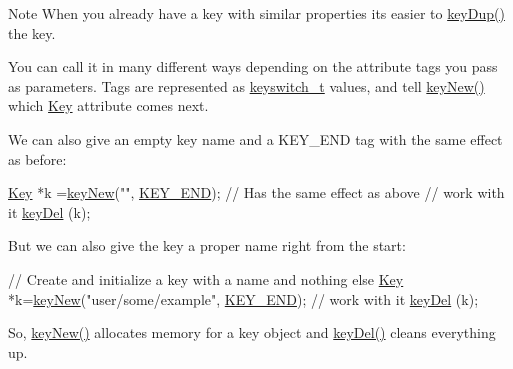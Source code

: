 \begin{DoxyNote}{Note}
When you already have a key with similar properties its easier to \hyperlink{group__key_gae6ec6a60cc4b8c1463fa08623d056ce3}{key\+Dup()} the key.
\end{DoxyNote}
You can call it in many different ways depending on the attribute tags you pass as parameters. Tags are represented as \hyperlink{group__key_ga91fb3178848bd682000958089abbaf40}{keyswitch\+\_\+t} values, and tell \hyperlink{group__key_gad23c65b44bf48d773759e1f9a4d43b89}{key\+New()} which \hyperlink{classkdb_1_1Key}{Key} attribute comes next.

We can also give an empty key name and a K\+E\+Y\+\_\+\+E\+ND tag with the same effect as before\+:


\begin{DoxyCodeInclude}
\hyperlink{classkdb_1_1Key_a5679f5cae63caddd64a60388b9cc77fa}{Key} *k =\hyperlink{group__key_gad23c65b44bf48d773759e1f9a4d43b89}{keyNew}(\textcolor{stringliteral}{""}, \hyperlink{group__key_gga91fb3178848bd682000958089abbaf40aa8adb6fcb92dec58fb19410eacfdd403}{KEY\_END}); \textcolor{comment}{// Has the same effect as above}
\textcolor{comment}{// work with it}
\hyperlink{group__key_ga3df95bbc2494e3e6703ece5639be5bb1}{keyDel} (k);
\end{DoxyCodeInclude}
 But we can also give the key a proper name right from the start\+:


\begin{DoxyCodeInclude}
\textcolor{comment}{// Create and initialize a key with a name and nothing else}
\hyperlink{classkdb_1_1Key_a5679f5cae63caddd64a60388b9cc77fa}{Key} *k=\hyperlink{group__key_gad23c65b44bf48d773759e1f9a4d43b89}{keyNew}(\textcolor{stringliteral}{"user/some/example"}, \hyperlink{group__key_gga91fb3178848bd682000958089abbaf40aa8adb6fcb92dec58fb19410eacfdd403}{KEY\_END});
\textcolor{comment}{// work with it}
\hyperlink{group__key_ga3df95bbc2494e3e6703ece5639be5bb1}{keyDel} (k);
\end{DoxyCodeInclude}
 So, \hyperlink{group__key_gad23c65b44bf48d773759e1f9a4d43b89}{key\+New()} allocates memory for a key object and \hyperlink{group__key_ga3df95bbc2494e3e6703ece5639be5bb1}{key\+Del()} cleans everything up.

